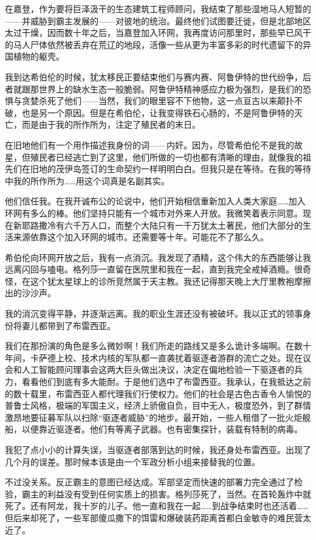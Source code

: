 \documentclass[AutoFakeBold=true]{book}
\begin{document}
{在嘉登，作为要将巨泽汲干的生态建筑工程师顾问，我结束了那些湿地马人短暂的——并威胁到霸主发展的——对彼地的统治。最终他们试图要迁徙，但是北部地区太过干燥，因而数十年之后，当嘉登加入环网，我再度访问那里时，那些早已风干的马人尸体依然被丢弃在荒辽的地段，活像一些从更为丰富多彩的时代遗留下的异国植物的躯壳。

我到达希伯伦的时候，犹太移民正要结束他们与赛内赛、阿鲁伊特的世代纷争，后者就跟那世界上的缺水生态一般脆弱。阿鲁伊特精神感应力极为强烈，是我们的恐惧与贪婪杀死了他们——当然，我们的眼里容不下他物，这一点亘古以来颠扑不破，也是另一个原因。但是在希伯伦，让我变得铁石心肠的，不是阿鲁伊特的灭亡，而是由于我的所作所为，注定了殖民者的末日。

在旧地他们有一个用作描述我身份的词——内奸。因为，尽管希伯伦不是我的故星，但殖民者已经逃亡到了这里，他们所做的一切也都有清晰的理由，就像我的祖先们在旧地的茂伊岛签订的生命契约一样明明白白。但我只是在等待。在我的等待中我的所作所为……用这个词真是名副其实。

他们信任我。在我开诚布公的论说中，他们开始相信重新加入人类大家庭……加入环网有多么的棒。他们坚持只能有一个城市对外来人开放。我微笑着表示同意。现在新耶路撒冷有六千万人口，而整个大陆只有一千万犹太土著民，他们大部分的生活来源依靠这个加入环网的城市。还需要等十年。可能花不了那么久。

希伯伦向环网开放之后，我有一点消沉。我发现了酒精，这个伟大的东西能够让我远离闪回与嗑电。格列莎一直留在医院里和我在一起，直到我完全戒掉酒瘾。很奇怪，在这个犹太星球上的诊所竞然属于天主教。我还记得那天晚上大厅里教袍摩擦出的沙沙声。

我的消沉变得平静，并逐渐远离。我的职业生涯还没有被破坏。我以正式的领事身份将妻儿都带到了布雷西亚。

我们在那扮演的角色是多么微妙啊！我们所走的路线又是多么诡计多端啊。在数十年间，卡萨德上校、技术内核的军队都一直袭扰着驱逐者游群的流亡之处。现在议会和人工智能顾问理事会这两大巨头做出决议，决定在偏地检验一下驱逐者的兵力，看看他们到底有多大能耐。于是他们选中了布雷西亚。我承认，在我抵达之前的数十载里，布雷西亚人都代理我们行使权力。他们的社会是古色古香令人愉悦的普鲁士风格，极端的军国主义，经济上骄傲自负，目中无人，极度恐外，到了群情激昂地要征募军队以扫除``驱逐者威胁''的地步。最开始，一些人租借了一批火炬舰船，以便靠近驱逐者。他们有等离子武器。也有密集探针，装载有特制的病毒。

我犯了点小小的计算失误，当驱逐者部落到达的时候，我还身处布雷西亚。出现了几个月的误差。那时候本该是由一个军政分析小组来接替我的位置。

不过没关系。反正霸主的意图已经达成。军部坚定而快速的部署力完全通过了检验，霸主的利益没有受到任何实质上的损害。格列莎死了，当然。在首轮轰炸中就死了。还有阿龙，我十岁的儿子。他一直和我在一起……到战争结束时也还活着……但后来却死了，一些军部傻瓜撒下的饵雷和爆破装药距离首都白金敏寺的难民营太近了。

}
\end{document}
